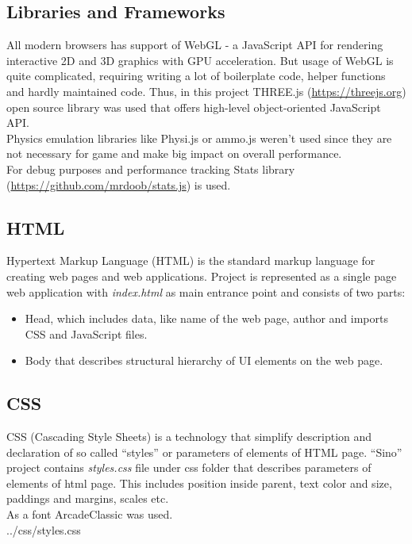 \documentclass[12pt]{article}
\begin{document}
\subsection{Libraries and Frameworks}
All modern browsers has support of WebGL - a JavaScript API for rendering interactive 2D and 3D graphics with GPU acceleration\citep{wiki:webgl}. But usage of WebGL is quite complicated, requiring writing a lot of boilerplate code, helper functions and hardly maintained code. Thus, in this project THREE.js (\url{https://threejs.org}) open source library was used that offers high-level object-oriented JavaScript API.
\\
Physics emulation libraries like Physi.js or ammo.js weren't used since they are not necessary for game and make big impact on overall performance.
\\
For debug purposes and performance tracking Stats library (\url{https://github.com/mrdoob/stats.js}) is used.
\subsection{HTML}
Hypertext Markup Language (HTML) is the standard markup language for creating web pages and web applications\citep{wiki:html}. Project is represented as a single page web application with \textit{index.html}  as main entrance point and consists of two parts:
\begin{itemize}
\item Head, which includes data, like name of the web page,  author and imports  CSS and JavaScript files.
\item Body that describes structural hierarchy of UI elements on the web page.
\end{itemize}
\subsection{CSS}
CSS (Cascading Style Sheets) is a technology that simplify description and declaration of so called ``styles'' or parameters of elements of HTML page\citep{wiki:css}. ``Sino'' project contains \textit{styles.css} file under css folder that describes parameters of elements of html page. This includes position inside parent, text color and size, paddings and margins, scales etc.
\\
As a font ArcadeClassic was used.
\\

{../css/styles.css}
\end{document}
